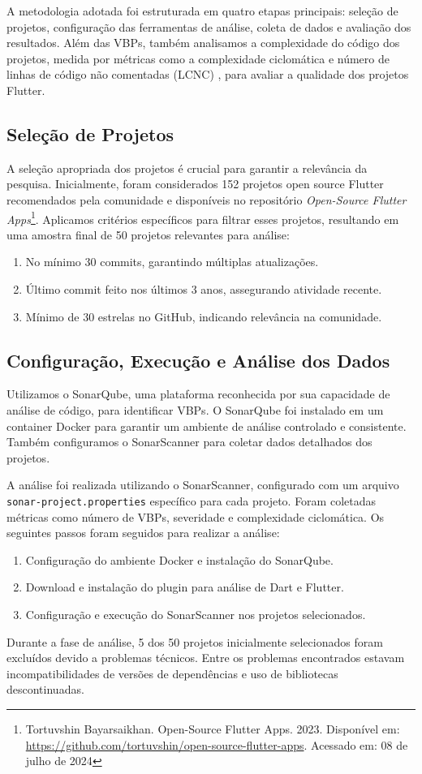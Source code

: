 \documentclass[12pt]{article}
\begin{document}
A metodologia adotada foi estruturada em quatro etapas principais: seleção de projetos, configuração das ferramentas de análise, coleta de dados e avaliação dos resultados. Além das VBPs, também analisamos a complexidade do código dos projetos, medida por métricas como a complexidade ciclomática e número de linhas de código não comentadas (LCNC) \cite{mccabe1976complexity}, para avaliar a qualidade dos projetos Flutter.

\subsection{Seleção de Projetos}
A seleção apropriada dos projetos é crucial para garantir a relevância da pesquisa. Inicialmente, foram considerados 152 projetos open source Flutter recomendados pela comunidade e disponíveis no repositório \textit{Open-Source Flutter Apps}\footnote{Tortuvshin Bayarsaikhan. Open-Source Flutter Apps. 2023. Disponível em: \url{https://github.com/tortuvshin/open-source-flutter-apps}. Acessado em: 08 de julho de 2024}. Aplicamos critérios específicos para filtrar esses projetos, resultando em uma amostra final de 50 projetos relevantes para análise:
\begin{enumerate}
    \item No mínimo 30 commits, garantindo múltiplas atualizações.
    \item Último commit feito nos últimos 3 anos, assegurando atividade recente.
    \item Mínimo de 30 estrelas no GitHub, indicando relevância na comunidade.
\end{enumerate}

\subsection{Configuração, Execução e Análise dos Dados}
Utilizamos o SonarQube, uma plataforma reconhecida por sua capacidade de análise de código, para identificar VBPs. O SonarQube foi instalado em um container Docker para garantir um ambiente de análise controlado e consistente. Também configuramos o SonarScanner para coletar dados detalhados dos projetos.

A análise foi realizada utilizando o SonarScanner, configurado com um arquivo \texttt{sonar-project.properties} específico para cada projeto. Foram coletadas métricas como número de VBPs, severidade e complexidade ciclomática. Os seguintes passos foram seguidos para realizar a análise:
\begin{enumerate}
    \item Configuração do ambiente Docker e instalação do SonarQube.
    \item Download e instalação do plugin para análise de Dart e Flutter.
    \item Configuração e execução do SonarScanner nos projetos selecionados.
\end{enumerate}
Durante a fase de análise, 5 dos 50 projetos inicialmente selecionados foram excluídos devido a problemas técnicos. Entre os problemas encontrados estavam incompatibilidades de versões de dependências e uso de bibliotecas descontinuadas.
\end{document}
